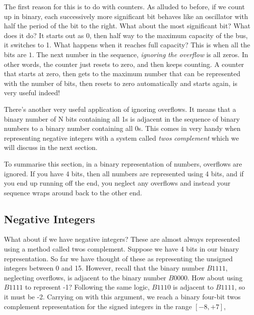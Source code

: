 \documentclass[../physical_computing.tex]{subfiles}
\begin{document}
The first reason for this is to do with counters. As alluded to before, if we count up in binary, each successively more significant bit behaves like an oscillator with half the period of the bit to the right. What about the most significant bit? What does it do? It starts out as 0, then half way to the maximum capacity of the bus, it switches to 1. What happens when it reaches full capacity? This is when all the bits are $1$. The next number in the sequence, {\it ignoring the overflow} is all zeros. In other words, the counter just resets to zero, and then keeps counting. A counter that starts at zero, then gets to the maximum number that can be represented with the number of bits, then resets to zero automatically and starts again, is very useful indeed!

There's another very useful application of ignoring overflows. It means that a binary number of N bits containing all 1s is adjacent in the sequence of binary numbers to a binary number containing all 0s. This comes in very handy when representing negative integers with a system called {\it twos complement} which we will discuss in the next section.

To summarise this section, in a binary representation of numbers, overflows are ignored. If you have 4 bits, then all numbers are represented using 4 bits, and if you end up running off the end, you neglect any overflows and instead your sequence wraps around back to the other end.

\subsection{Negative Integers}
\label{sec:negatives}

What about if we have negative integers? These are almost always represented using a method called twos complement. Suppose we have 4 bits in our binary representation. So far we have thought of these as representing the unsigned integers between 0 and 15. However, recall that the binary number $B1111$, neglecting overflows, is adjacent to the binary number $B0000$. How about using $B1111$ to represent -1? Following the same logic, $B1110$ is adjacent to $B1111$, so it must be -2. Carrying on with this argument, we reach a binary four-bit twos complement representation for the signed integers in the range $[-8,+7]$,
\end{document}

